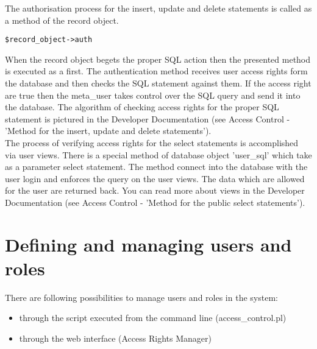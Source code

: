 The authorisation process for the insert, update and delete statements is called as a method of the record object.
\begin{verbatim}
$record_object->auth
\end{verbatim}
When the record object begets the proper SQL action then the presented method is executed as a first. The authentication method receives user access rights form the database and then checks the SQL statement against them. If the access right are true then the meta\_user takes control over the SQL query and send it into the database. The algorithm of checking access rights for the proper SQL statement is pictured in the Developer Documentation (see Access Control - 'Method for the insert, update and delete statements').\\

The process of verifying access rights for the select statements is accomplished via user views. There is a special method of database object 'user\_sql' which take as a parameter select statement. The method connect into the database with the user login and enforces the query on the user views. The data which are allowed for the user are returned back. You can read more about views in the Developer Documentation (see Access Control - 'Method for the public select statements').

\section{Defining and managing users and roles}

There are following possibilities to manage users and roles in the system:
\begin{itemize}
\item through the script executed from the command line (access\_control.pl)
\item through the web interface (Access Rights Manager)
\end{itemize} 


